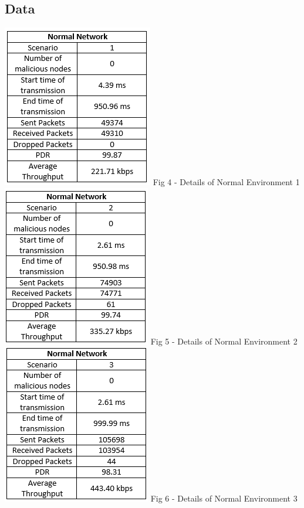\documentclass[conference,12pt]{IEEEtran}
\begin{document}
\subsection{Data}
\begin{center}
\includegraphics{NNScen1}
\linebreak 
Fig 4 - Details of Normal Environment 1
\includegraphics{NNScen2}
\linebreak 
Fig 5 - Details of Normal Environment 2
\includegraphics{NNScen3}
\linebreak
Fig 6 - Details of Normal Environment 3

\end{center}
\end{document}
